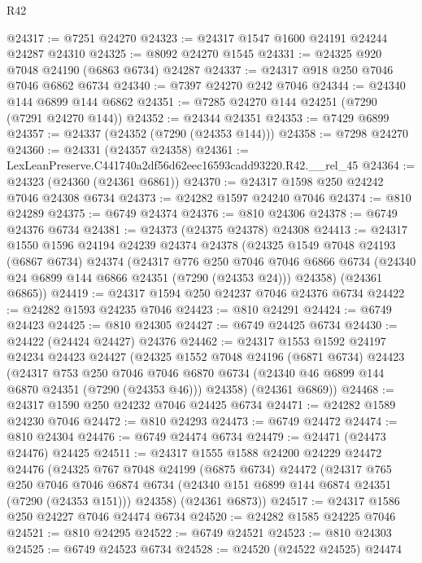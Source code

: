 \begin{lexlean}{R42}
\begin{coremodule}
{@24317 := @7251 @24270
@24323 := @24317 @1547 @1600 @24191 @24244 @24287 @24310
@24325 := @8092 @24270 @1545
@24331 := @24325 @920 @7048 @24190 (@6863 @6734) @24287
@24337 := @24317 @918 @250 @7046 @7046 @6862 @6734
@24340 := @7397 @24270 @242 @7046
@24344 := @24340 @144 @6899 @144 @6862
@24351 := @7285 @24270 @144 @24251 (@7290 (@7291 @24270 @144))
@24352 := @24344 @24351
@24353 := @7429 @6899
@24357 := @24337 (@24352 (@7290 (@24353 @144)))
@24358 := @7298 @24270
@24360 := @24331 (@24357 @24358)
@24361 := LexLeanPreserve.C441740a2df56d62eec16593cadd93220.R42.__rel_45
@24364 := @24323 (@24360 (@24361 @6861))
@24370 := @24317 @1598 @250 @24242 @7046 @24308 @6734
@24373 := @24282 @1597 @24240 @7046
@24374 := @810 @24289
@24375 := @6749 @24374
@24376 := @810 @24306
@24378 := @6749 @24376 @6734
@24381 := @24373 (@24375 @24378) @24308
@24413 := @24317
    @1550
    @1596
    @24194
    @24239
    @24374
    @24378
    (@24325
      @1549
      @7048
      @24193
      (@6867 @6734)
      @24374
      (@24317
        @776
        @250
        @7046
        @7046
        @6866
        @6734
        (@24340 @24 @6899 @144 @6866 @24351 (@7290 (@24353 @24)))
        @24358)
      (@24361 @6865))
@24419 := @24317 @1594 @250 @24237 @7046 @24376 @6734
@24422 := @24282 @1593 @24235 @7046
@24423 := @810 @24291
@24424 := @6749 @24423
@24425 := @810 @24305
@24427 := @6749 @24425 @6734
@24430 := @24422 (@24424 @24427) @24376
@24462 := @24317
    @1553
    @1592
    @24197
    @24234
    @24423
    @24427
    (@24325
      @1552
      @7048
      @24196
      (@6871 @6734)
      @24423
      (@24317
        @753
        @250
        @7046
        @7046
        @6870
        @6734
        (@24340 @46 @6899 @144 @6870 @24351 (@7290 (@24353 @46)))
        @24358)
      (@24361 @6869))
@24468 := @24317 @1590 @250 @24232 @7046 @24425 @6734
@24471 := @24282 @1589 @24230 @7046
@24472 := @810 @24293
@24473 := @6749 @24472
@24474 := @810 @24304
@24476 := @6749 @24474 @6734
@24479 := @24471 (@24473 @24476) @24425
@24511 := @24317
    @1555
    @1588
    @24200
    @24229
    @24472
    @24476
    (@24325
      @767
      @7048
      @24199
      (@6875 @6734)
      @24472
      (@24317
        @765
        @250
        @7046
        @7046
        @6874
        @6734
        (@24340 @151 @6899 @144 @6874 @24351 (@7290 (@24353 @151)))
        @24358)
      (@24361 @6873))
@24517 := @24317 @1586 @250 @24227 @7046 @24474 @6734
@24520 := @24282 @1585 @24225 @7046
@24521 := @810 @24295
@24522 := @6749 @24521
@24523 := @810 @24303
@24525 := @6749 @24523 @6734
@24528 := @24520 (@24522 @24525) @24474
}
\end{coremodule}
\end{lexlean}
